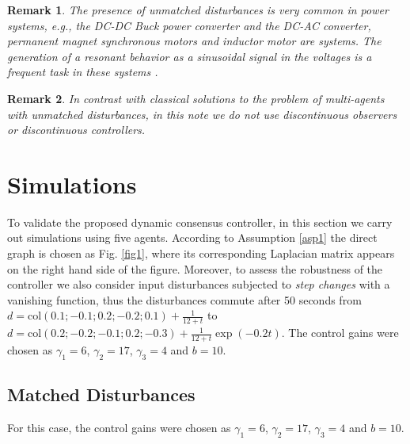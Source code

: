 \documentclass[journal,twoside]{IEEEtran}
\newtheorem{remark}{Remark}
\newcommand{\col}{ \mbox{col} }
\def\col{\mbox{col}}
\begin{document}
\begin{remark} \em
The presence of unmatched disturbances is very common in power systems, e.g., the DC-DC Buck power converter and the DC-AC converter, permanent magnet synchronous motors and inductor motor are systems. 
The generation of a resonant behavior as a sinusoidal signal in the voltages is a frequent task in these systems \cite{SAIISHISH, ANGOLITAB}.
\end{remark}

\begin{remark} \em
In contrast with classical solutions to the problem of multi-agents with unmatched disturbances, in this note we do not use discontinuous observers or discontinuous controllers. 
\end{remark}

 \section{Simulations}
 To validate the proposed dynamic consensus controller, in this section we carry out simulations using five agents.  According to Assumption \ref{asp1} the direct graph   is chosen as Fig. \ref{fig1}, where its corresponding Laplacian matrix appears on the right hand side of the figure. Moreover, to assess the robustness of the controller we also consider input disturbances subjected to {\it step changes} with a vanishing function, thus the  disturbances  commute  after 50 seconds from $d=\col( 0.1;-0.1;  0.2; -0.2; 0.1) + \frac{1}{12+t} $ to  $d=\col(0.2;-0.2;-0.1;0.2;-0.3) +\frac{1}{12+t} \exp(-0.2t)$.  The control gains were chosen as $\gamma_1=6$, $\gamma_2=17$, $\gamma_3=4$ and $b=10$.
  
 \subsection*{Matched Disturbances}
 
For this case, the control gains were chosen as $\gamma_1=6$, $\gamma_2=17$, $\gamma_3=4$ and $b=10$.
 
\end{document}
